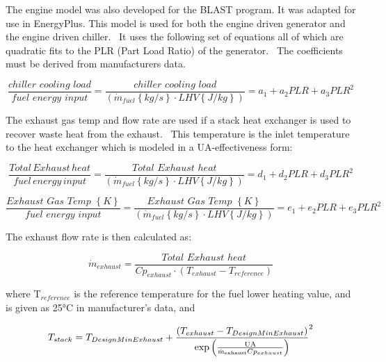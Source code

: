 The engine model was also developed for the BLAST program. It was adapted for use in EnergyPlus. This model is used for both the engine driven generator and the engine driven chiller.~ It uses the following set of equations all of which are quadratic fits to the PLR (Part Load Ratio) of the generator.~ The coefficients must be derived from manufacturers data.

\begin{equation}
\frac{{chiller\,\,cooling\,\,load}}{{fuel\,\,energy\,\,input}} = \frac{{chiller\,\,cooling\,\,load}}{{\left( {{{\dot m}_{fuel}}\left\{ {kg/s} \right\} \cdot LHV\left\{ {J/kg} \right\}} \right)}} = {a_1} + {a_2}PLR + {a_3}PL{R^2}
\end{equation}

The exhaust gas temp and flow rate are used if a stack heat exchanger is used to recover waste heat from the exhaust.~ This temperature is the inlet temperature to the heat exchanger which is modeled in a UA-effectiveness form:

\begin{equation}
\frac{{Total\,Exhaust\,heat}}{{fuel\,energy\,input}} = \frac{{Total\,\,Exhaust\,\,heat}}{{\left( {{{\dot m}_{fuel}}\left\{ {kg/s} \right\} \cdot LHV\left\{ {J/kg} \right\}} \right)}} = {d_1} + {d_2}PLR + {d_3}PL{R^2}
\end{equation}

\begin{equation}
\frac{{Exhaust\,\,Gas\,\,Temp\,\,\left\{ K \right\}}}{{fuel\,\,energy\,\,input}} = \frac{{Exhaust\,\,Gas\,\,Temp\,\,\left\{ K \right\}}}{{\left( {{{\dot m}_{fuel}}\left\{ {kg/s} \right\} \cdot LHV\left\{ {J/kg} \right\}} \right)}} = {e_1} + {e_2}PLR + {e_3}PL{R^2}
\end{equation}

The exhaust flow rate is then calculated as:

\begin{equation}
{\dot m_{exhaust}} = \frac{{Total\,\,Exhaust\,\,heat}}{{C{p_{exhaust}} \cdot \left( {{T_{exhaust}} - {T_{reference}}} \right)}}
\end{equation}

where T\(_{reference}\) is the reference temperature for the fuel lower heating value, and is given as 25°C in manufacturer's data, and

\begin{equation}
{T_{stack}} = {T_{DesignMinExhaust}} + {\frac{{\left( {{T_{exhaust}} - {T_{DesignMinExhaust}}} \right)}}{{{\rm{exp}}\left( {\frac{{{\rm{UA}}}}{{{{{\rm{\dot m}}}_{{\rm{exhaust}}}}C{p_{exhaust}}}}} \right)}}^2}
\end{equation}

